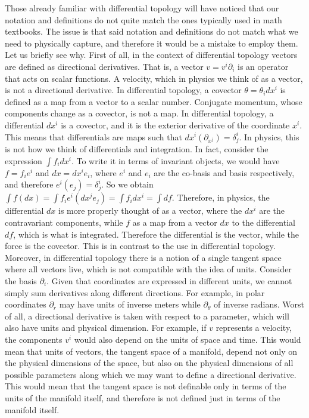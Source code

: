 Those already familiar with differential topology will have noticed that our notation and definitions do not quite match the ones typically used in math textbooks. The issue is that said notation and definitions do not match what we need to physically capture, and therefore it would be a mistake to employ them. Let us briefly see why. First of all, in the context of differential topology vectors are defined as directional derivatives. That is, a vector $v = v^i \partial_i$ is an operator that acts on scalar functions. A velocity, which in physics we think of as a vector, is not a directional derivative. In differential topology, a covector $\theta = \theta_i dx^i $ is defined as a map from a vector to a scalar number. Conjugate momentum, whose components change as a covector, is not a map. In differential topology, a differential $dx^i$ is a covector, and it is the exterior derivative of the coordinate $x^i$. This means that differentials are maps such that $dx^i(\partial_{x^j}) = \delta^i_j$. In physics, this is not how we think of differentials and integration. In fact, consider the expression $\int f_i dx^i$. To write it in terms of invariant objects, we would have $f = f_i e^i$ and $dx = dx^i e_i$, where $e^i$ and $e_i$ are the co-basis and basis respectively, and therefore $e^i(e_j) = \delta^i_j$. So we obtain $\int f( dx ) = \int f_i e^i(dx^j e_j) = \int f_i dx^i = \int df$. Therefore, in physics, the differential $dx$ is more properly thought of as a vector, where the $dx^i$ are the contravariant components, while $f$ as a map from a vector $dx$ to the differential $df$, which is what is integrated. Therefore the differential is the vector, while the force is the covector. This is in contrast to the use in differential topology. Moreover, in differential topology there is a notion of a single tangent space where all vectors live, which is not compatible with the idea of units. Consider the basis $\partial_i$. Given that coordinates are expressed in different units, we cannot simply sum derivatives along different directions. For example, in polar coordinates $\partial_r$ may have units of inverse meters while $\partial_\theta$ of inverse radians. Worst of all, a directional derivative is taken with respect to a parameter, which will also have units and physical dimension. For example, if $v$ represents a velocity, the components $v^i$ would also depend on the units of space and time. This would mean that units of vectors, the tangent space of a manifold, depend not only on the physical dimensions of the space, but also on the physical dimensions of all possible parameters along which we may want to define a directional derivative. This would mean that the tangent space is not definable only in terms of the units of the manifold itself, and therefore is not defined just in terms of the manifold itself.

